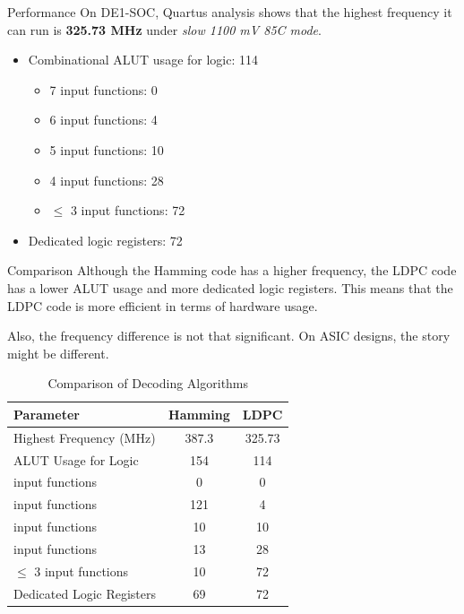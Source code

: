 \documentclass{beamer}
\begin{document}
\begin{frame}{Performance}
  On DE1-SOC, Quartus analysis shows that the highest frequency it can run is \textbf{325.73 MHz} under \textit{slow 1100 mV 85C mode}.

  \begin{itemize}
    \item Combinational ALUT usage for logic: 114 \begin{itemize}
      \item 7 input functions: 0
      \item 6 input functions: 4
      \item 5 input functions: 10
      \item 4 input functions: 28
      \item $\leq$ 3 input functions: 72
    \end{itemize}
    \item Dedicated logic registers: 72
  \end{itemize}
\end{frame}

\begin{frame}{Comparison}
  Although the Hamming code has a higher frequency, the LDPC code has a lower ALUT usage and more dedicated logic registers. This means that the LDPC code is more efficient in terms of hardware usage.

Also, the frequency difference is not that significant. On ASIC designs, the story might be different. 
  \begin{table}[htbp]
    \centering
    \caption{Comparison of Decoding Algorithms}
    \label{tab:decoding_comparison}
    \begin{tabular}{|l|c|c|}
      \hline
      \textbf{Parameter} & \textbf{Hamming} & \textbf{LDPC} \\
      \hline
      Highest Frequency (MHz) & 387.3 & 325.73 \\
      \hline
      ALUT Usage for Logic & 154 & 114 \\
      \quad 7 input functions & 0 & 0 \\
      \quad 6 input functions & 121 & 4 \\
      \quad 5 input functions & 10 & 10 \\
      \quad 4 input functions & 13 & 28 \\
      \quad $\leq$ 3 input functions & 10 & 72 \\
      \hline
      Dedicated Logic Registers & 69 & 72 \\
      \hline
    \end{tabular}
  \end{table}
\end{frame}
\end{document}
